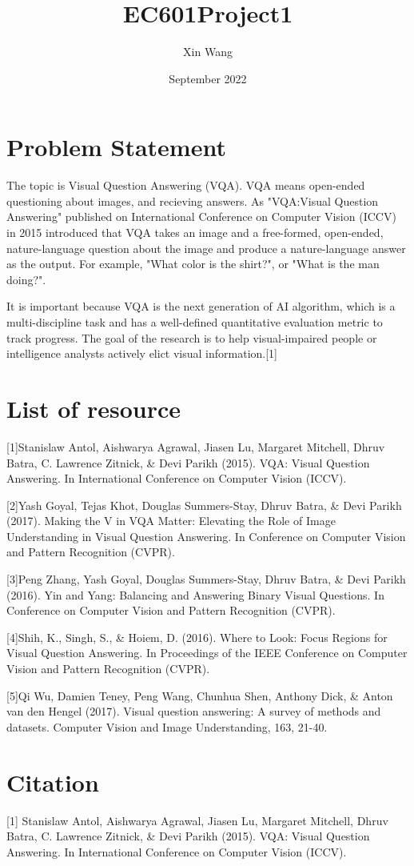 \documentclass{article}
\title{EC601Project1}
\author{Xin Wang}
\date{September 2022}
\begin{document}
\maketitle

\section{Problem Statement}
The topic is Visual Question Answering (VQA). VQA means open-ended questioning about images, and recieving answers. As "VQA:Visual Question Answering" published on International Conference on Computer Vision (ICCV) in 2015 introduced that VQA takes an image and a free-formed, open-ended, nature-language question about the image and produce a nature-language answer as the output. For example, "What color is the shirt?", or "What is the man doing?".\

It is important because VQA is the next generation of AI algorithm, which is a multi-discipline task and has a well-defined quantitative evaluation metric to track progress. The goal of the research is to help visual-impaired people or intelligence analysts actively elict visual information.[1] 

\section{List of resource}
[1]Stanislaw Antol, Aishwarya Agrawal, Jiasen Lu, Margaret Mitchell, Dhruv Batra, C. Lawrence Zitnick, & Devi Parikh (2015). VQA: Visual Question Answering. In International Conference on Computer Vision (ICCV).

[2]Yash Goyal, Tejas Khot, Douglas Summers-Stay, Dhruv Batra, & Devi Parikh (2017). Making the V in VQA Matter: Elevating the Role of Image Understanding in Visual Question Answering. In Conference on Computer Vision and Pattern Recognition (CVPR).

[3]Peng Zhang, Yash Goyal, Douglas Summers-Stay, Dhruv Batra, & Devi Parikh (2016). Yin and Yang: Balancing and Answering Binary Visual Questions. In Conference on Computer Vision and Pattern Recognition (CVPR).

[4]Shih, K., Singh, S., & Hoiem, D. (2016). Where to Look: Focus Regions for Visual Question Answering. In Proceedings of the IEEE Conference on Computer Vision and Pattern Recognition (CVPR).

[5]Qi Wu, Damien Teney, Peng Wang, Chunhua Shen, Anthony Dick, & Anton van den Hengel (2017). Visual question answering: A survey of methods and datasets. Computer Vision and Image Understanding, 163, 21-40.

\section{Citation}
[1] Stanislaw Antol, Aishwarya Agrawal, Jiasen Lu, Margaret Mitchell, Dhruv Batra, C. Lawrence Zitnick, & Devi Parikh (2015). VQA: Visual Question Answering. In International Conference on Computer Vision (ICCV).
\end{document}
